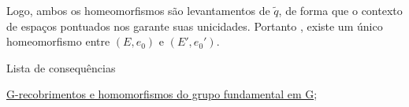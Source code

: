 \begin{dem}
    Logo, ambos os homeomorfismos são levantamentos de $\tilde q$, de forma que o contexto de espaços pontuados nos garante suas unicidades. Portanto  , existe um único homeomorfismo entre $(E, e_0)$ e $(E', e_0')$.
\end{dem}

\begin{titlemize}{Lista de consequências}
	\item \hyperref[homomorfismos-e-g-recobrimentos-prop]{G-recobrimentos e homomorfismos do grupo fundamental em G};
\end{titlemize}
